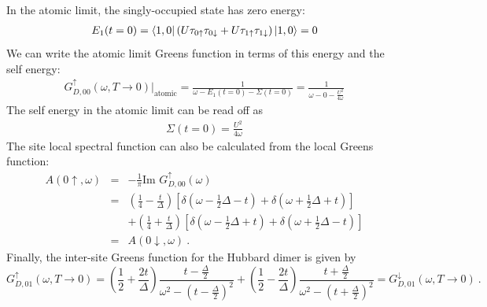 \documentclass[12pt]{article}
\numberwithin{equation}{section}
\begin{document}
In the atomic limit, the singly-occupied state has zero energy:
\begin{equation}\begin{aligned}
	E_1(t=0) = \bra{1,0}\left(U \tau_{0 \uparrow}\tau_{0 \downarrow} + U \tau_{1 \uparrow}\tau_{1 \downarrow}\right) \ket{1,0} = 0
\end{aligned}\end{equation}
We can write the atomic limit Greens function in terms of this energy and the self energy:
\begin{equation}\begin{aligned}
	G_{D,00}^\uparrow(\omega, T \to 0) \bigg\vert_\text{atomic} = \frac{1}{\omega - E_1(t=0) - \Sigma(t=0)} = \frac{1}{\omega - 0 -\frac{U^2}{4\omega}}
\end{aligned}\end{equation}
The self energy in the atomic limit can be read off as 
\begin{equation}\begin{aligned}
	\label{dimer_selfenergy}
\Sigma(t=0) = \frac{U^2}{4\omega}
\end{aligned}\end{equation}
The site local spectral function can also be calculated from the local Greens function:
\begin{eqnarray}
A(0\uparrow, \omega) &=& - \frac{1}{\pi}\text{Im }G_{D,00}^\uparrow(\omega)\nonumber\\
			     &=& \left( \frac{1}{4} - \frac{t}{\Delta} \right)\left[\delta(\omega - \frac{1}{2}\Delta - t) + \delta(\omega + \frac{1}{2}\Delta + t)\right]\nonumber\\ 
			     &&+ \left( \frac{1}{4} + \frac{t}{\Delta} \right) \left[\delta(\omega - \frac{1}{2}\Delta + t) + \delta(\omega + \frac{1}{2}\Delta - t)\right]\\ 
			     &=& A(0\downarrow, \omega)~.\nonumber
\end{eqnarray}
Finally, the inter-site Greens function for the Hubbard dimer is given by
\begin{equation}
\label{dimer_intersite_G}
G_{D,01}^\uparrow(\omega, T \to 0) = \left( \frac{1}{2} + \frac{2t}{\Delta} \right) \frac{t - \frac{\Delta}{2}}{\omega^2 - \left(t - \frac{\Delta}{2}\right)^2} + \left( \frac{1}{2} - \frac{2t}{\Delta} \right) \frac{t + \frac{\Delta}{2}}{\omega^2 - \left(t + \frac{\Delta}{2}\right)^2} = G_{D,01}^\downarrow(\omega, T \to 0)~.
\end{equation}
\end{document}
